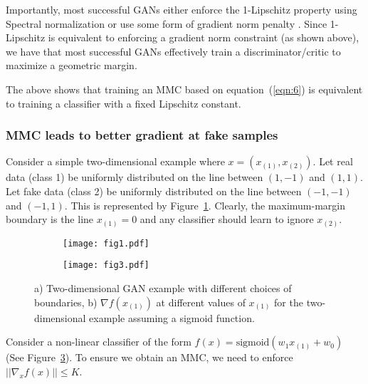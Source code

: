 \documentclass{article}
\begin{document}
Importantly, most successful GANs \citep{brock2018large,karras2019style,karras2017progressive} either enforce the 1-Lipschitz property using Spectral normalization \citep{miyato2018spectral} or use some form of gradient norm penalty \citep{WGAN-GP,mescheder2018training}. Since 1-Lipschitz is equivalent to enforcing a gradient norm constraint (as shown above), we have that most successful GANs effectively train a discriminator/critic to maximize a geometric margin.

The above shows that training an MMC based on equation~(\ref{eqn:6}) is equivalent to training a classifier with a fixed Lipschitz constant.

\subsubsection{MMC leads to better gradient at fake samples}

Consider a simple two-dimensional example where $x=(x_{(1)},x_{(2)})$. Let real data (class 1) be uniformly distributed on the line between $(1,-1)$ and $(1,1)$. Let fake data (class 2) be uniformly distributed on the line between $(-1,-1)$ and $(-1,1)$. This is represented by Figure~\ref{fig:fig1}.  Clearly, the maximum-margin boundary is the line $x_{(1)}=0$ and any classifier should learn to ignore $x_{(2)}$. 

\begin{figure}[!ht]
	\centering
	\begin{subfigure}[t]{0.5\textwidth}
    	\centering\texttt{[image: fig1.pdf]}
    	\caption{}
    	\label{fig:fig1}
	\end{subfigure}\begin{subfigure}[t]{0.5\textwidth}
    	\centering\texttt{[image: fig3.pdf]}
    	\caption{}
    	\label{fig:fig2}
	\end{subfigure}
	\caption{a) Two-dimensional GAN example with different choices of boundaries, b) $\nabla f(x_{(1)})$ at different values of $x_{(1)}$ for the two-dimensional example assuming a sigmoid function.}
\end{figure}

Consider a non-linear classifier of the form $f(x)=\text{sigmoid}(w_1 x_{(1)}+w_0)$ (See Figure~\ref{fig:fig2}). To ensure we obtain an MMC, we need to enforce $||\nabla_{x} f(x)|| \leq K$.
\end{document}
